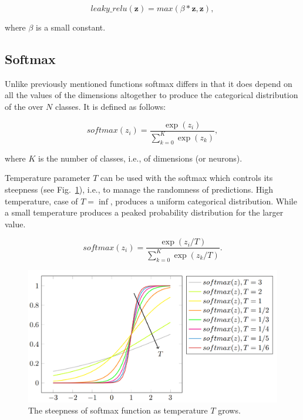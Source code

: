\begin{equation}\label{eq:lrelu}
    leaky\_relu(\mathbf{z}) = max(\beta*\mathbf{z}, \mathbf{z}),
\end{equation}

\noindent where $\beta$ is a small constant.

\subsection{Softmax}\label{sec:softmax}
 Unlike previously mentioned functions softmax differs in that it does depend on all the values of the dimensions altogether to produce the categorical distribution of the over $N$ classes. It is defined as follows:

\begin{equation}\label{eq:softmax}
    softmax(z_i) = \frac{\exp(z_i)}{\sum_{k=0}^K{\exp(z_k)}},
\end{equation}

\noindent where $K$ is the number of classes, i.e., of dimensions (or neurons).

Temperature parameter $T$ can be used with the softmax which controls its steepness (see Fig.~\ref{fig:softmax}), i.e., to manage the randomness of predictions. High temperature, case of $T = \inf$, produces a uniform categorical distribution. While a small temperature produces a peaked probability distribution for the larger value.


\begin{equation}\label{eq:softmax_tmp}
    softmax(z_i) = \frac{\exp(z_i / T)}
    {\sum_{k=0}^K{\exp(z_k / T)}}.
\end{equation}

\begin{figure}[t]
    \centering
    \includegraphics[width=\textwidth]{Figures/Softmaxbehaviour.png}
    \caption{The steepness of softmax function as temperature $T$ grows.}\label{fig:softmax}
\end{figure}

